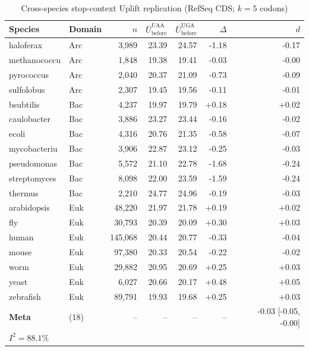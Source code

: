 
\begin{table}[htbp]
\centering
\caption{Cross-species stop-context Uplift replication (RefSeq CDS; $k=5$ codons)}
\label{tab:cross_species_stop_context}
\begin{tabular}{llrrrrr}
\toprule
Species & Domain & $n$ & $\bar{U}_{\mathrm{before}}^{\mathrm{UAA}}$ & $\bar{U}_{\mathrm{before}}^{\mathrm{UGA}}$ & $\Delta$ & $d$ \\
\midrule
haloferax & Arc & 3,989 & 23.39 & 24.57 & -1.18 & -0.17 \\
methanococcu & Arc & 1,848 & 19.38 & 19.41 & -0.03 & -0.00 \\
pyrococcus & Arc & 2,040 & 20.37 & 21.09 & -0.73 & -0.09 \\
sulfolobus & Arc & 2,307 & 19.45 & 19.56 & -0.11 & -0.01 \\
bsubtilis & Bac & 4,237 & 19.97 & 19.79 & +0.18 & +0.02 \\
caulobacter & Bac & 3,886 & 23.27 & 23.44 & -0.16 & -0.02 \\
ecoli & Bac & 4,316 & 20.76 & 21.35 & -0.58 & -0.07 \\
mycobacteriu & Bac & 3,906 & 22.87 & 23.12 & -0.25 & -0.03 \\
pseudomonas & Bac & 5,572 & 21.10 & 22.78 & -1.68 & -0.24 \\
streptomyces & Bac & 8,098 & 22.00 & 23.59 & -1.59 & -0.24 \\
thermus & Bac & 2,210 & 24.77 & 24.96 & -0.19 & -0.03 \\
arabidopsis & Euk & 48,220 & 21.97 & 21.78 & +0.19 & +0.02 \\
fly & Euk & 30,793 & 20.39 & 20.09 & +0.30 & +0.03 \\
human & Euk & 145,068 & 20.44 & 20.77 & -0.33 & -0.04 \\
mouse & Euk & 97,380 & 20.33 & 20.54 & -0.22 & -0.02 \\
worm & Euk & 29,882 & 20.95 & 20.69 & +0.25 & +0.03 \\
yeast & Euk & 6,027 & 20.66 & 20.17 & +0.48 & +0.05 \\
zebrafish & Euk & 89,791 & 19.93 & 19.68 & +0.25 & +0.03 \\
\midrule
\textbf{Meta} & (18) & -- & -- & -- & -- & -0.03 [-0.05, -0.00] \\
\multicolumn{7}{l}{$I^2 = 88.1\%$} \\
\bottomrule
\end{tabular}
\end{table}
